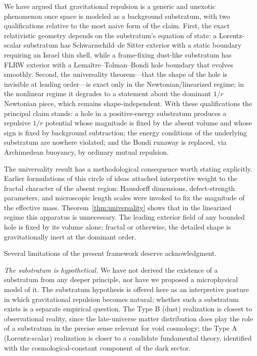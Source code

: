 \documentclass[%
  reprint,
  superscriptaddress,
  showpacs,
  showkeys,
  amsmath,amssymb,
  pra,
  longbibliography,
  floatfix,
  x11names
]{revtex4-2}
\begin{document}
We have argued that gravitational repulsion is a generic and unexotic phenomenon once space is modeled as a background substratum, with two qualifications relative to the most naive form of the claim. First, the exact relativistic geometry depends on the substratum's equation of state: a Lorentz-scalar substratum has Schwarzschild--de Sitter exterior with a static boundary requiring an Israel thin shell, while a frame-fixing dust-like substratum has FLRW exterior with a Lema\^itre--Tolman--Bondi hole boundary that evolves smoothly. Second, the universality theorem---that the shape of the hole is invisible at leading order---is exact only in the Newtonian/linearized regime; in the nonlinear regime it degrades to a statement about the dominant $1/r$ Newtonian piece, which remains shape-independent. With these qualifications the principal claim stands: a hole in a positive-energy substratum produces a repulsive $1/r$ potential whose magnitude is fixed by the absent volume and whose sign is fixed by background subtraction; the energy conditions of the underlying substratum are nowhere violated; and the Bondi runaway is replaced, via Archimedean buoyancy, by ordinary mutual repulsion.

The universality result has a methodological consequence worth stating explicitly. Earlier formulations of this circle of ideas attached interpretive weight to the fractal character of the absent region: Hausdorff dimensions, defect-strength parameters, and microscopic length scales were invoked to fix the magnitude of the effective mass. Theorem~\ref{thm:universality} shows that in the linearized regime this apparatus is unnecessary. The leading exterior field of any bounded hole is fixed by its volume alone; fractal or otherwise, the detailed shape is gravitationally inert at the dominant order.

Several limitations of the present framework deserve acknowledgment.

\emph{The substratum is hypothetical.} We have not derived the existence of a substratum from any deeper principle, nor have we proposed a microphysical model of it. The substratum hypothesis is offered here as an interpretive posture in which gravitational repulsion becomes natural; whether such a substratum exists is a separate empirical question. The Type B (dust) realization is closest to observational reality, since the late-universe matter distribution does play the role of a substratum in the precise sense relevant for void cosmology; the Type A (Lorentz-scalar) realization is closer to a candidate fundamental theory, identified with the cosmological-constant component of the dark sector.
\end{document}
